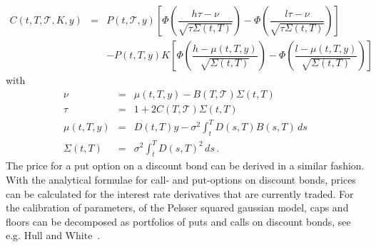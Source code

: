 \begin{eqnarray}
C(t, T, \mathcal{T}, K, y) & = & P(t, \mathcal{T}, y) \left[ \Phi \left( \dfrac{h \tau - \nu}{\sqrt{\tau \Sigma(t,T)}} \right) - \Phi \left( \dfrac{l \tau - \nu}{\sqrt{\tau \Sigma(t,T)}} \right) \right]  \\
                           &   & - P(t, T, y) K \left[ \Phi \left( \dfrac{h - \mu(t,T,y)}{\sqrt{ \Sigma(t,T)}} \right) - \Phi \left( \dfrac{l - \mu(t,T,y)}{\sqrt{\Sigma(t,T)}} \right) \right]  \nonumber
\end{eqnarray}
with
\begin{eqnarray}
\nu        &  =  & \mu(t,T,y) - B(T,\mathcal{T})\Sigma(t,T)  \nonumber \\
\tau       &  =  & 1 + 2 C(T,\mathcal{T})\Sigma(t,T)  \nonumber \\
\mu(t,T,y) &  =  & D(t,T) y - {\sigma}^2 \int_{t}^{T} D(s,T)B(s,T) \, ds  \nonumber \\
\Sigma(t,T)&  =  & {\sigma}^2 \int_{t}^{T} {D(s,T)}^2 \, ds  \, . \nonumber
\end{eqnarray}
The price for a put option on a discount bond can be derived in a similar fashion.
With the analytical formulae for call- and put-options on discount bonds, prices can be calculated for the interest rate derivatives that are currently traded.
For the calibration of parameters, of the Pelsser squared gaussian model, caps and floors can be decomposed as portfolios of puts and calls on discount bonds, see e.g. Hull and White~\cite{Hull:OptFutDer}.





